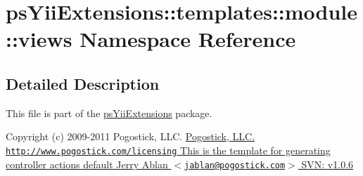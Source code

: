 \hypertarget{namespacepsYiiExtensions_1_1templates_1_1module_1_1views}{
\section{psYiiExtensions::templates::module::views Namespace Reference}
\label{namespacepsYiiExtensions_1_1templates_1_1module_1_1views}
}


\subsection{Detailed Description}
This file is part of the \hyperlink{namespacepsYiiExtensions}{psYiiExtensions} package.

Copyright (c) 2009-\/2011 Pogostick, LLC. \hyperlink{}{Pogostick, LLC.  \href{http://www.pogostick.com/licensing}{\tt http://www.pogostick.com/licensing} This is the template for generating controller actions   default   Jerry Ablan $<$\href{mailto:jablan@pogostick.com}{\tt jablan@pogostick.com}$>$  SVN:   v1.0.6   }